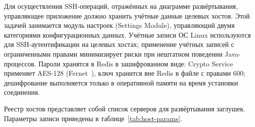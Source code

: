 


Для осуществления SSH-операций, отражённых на диаграмме развёртывания, управляющее приложение должно хранить учётные данные целевых хостов. Этой задачей занимается модуль настроек (Settings Module), управляющий двумя категориями конфигурационных данных. Учётные записи ОС Linux используются для SSH-аутентификации на целевых хостах; применение учётных записей с ограниченными правами минимизирует риски при нештатном поведении Java-процессов. Пароли хранятся в Redis в зашифрованном виде: Crypto Service применяет AES-128 (Fernet~\cite{cryptography-fernet}), ключ хранится вне Redis в файле с правами 600; дешифрование выполняется только в оперативной памяти на время установки соединения.

Реестр хостов представляет собой список серверов для развёртывания заглушек. Параметры записи приведены в таблице~\ref{tab:host-params}.


